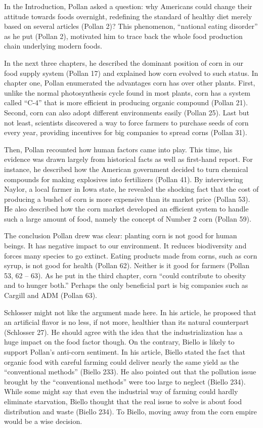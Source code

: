 In the Introduction, Pollan asked a question: why Americans could change
their attitude towards foods overnight, redefining the standard of
healthy diet merely based on several articles (Pollan 2)? This
phenomenon, ``national eating disorder'' as he put (Pollan 2), motivated
him to trace back the whole food production chain underlying modern
foods.

In the next three chapters, he described the dominant position of corn
in our food supply system (Pollan 17) and explained how corn evolved to
such status. In chapter one, Pollan enumerated the advantages corn has
over other plants. First, unlike the normal photosynthesis cycle found
in most plants, corn has a system called ``C-4'' that is more efficient
in producing organic compound (Pollan 21). Second, corn can also adopt
different environments easily (Pollan 25). Last but not least,
scientists discovered a way to force farmers to purchase seeds of corn
every year, providing incentives for big companies to spread corns
(Pollan 31).

Then, Pollan recounted how human factors came into play. This time, his
evidence was drawn largely from historical facts as well as first-hand
report. For instance, he described how the American government decided
to turn chemical compounds for making explosives into fertilizers
(Pollan 41). By interviewing Naylor, a local farmer in Iowa state, he
revealed the shocking fact that the cost of producing a bushel of corn
is more expensive than its market price (Pollan 53). He also described
how the corn market developed an efficient system to handle such a large
amount of food, namely the concept of Number 2 corn (Pollan 59).

The conclusion Pollan drew was clear: planting corn is not good for
human beings. It has negative impact to our environment. It reduces
biodiversity and forces many species to go extinct. Eating products made
from corns, such as corn syrup, is not good for health (Pollan 62).
Neither is it good for farmers (Pollan 53, 62 -- 63). As he put in the
third chapter, corn ``could contribute to obesity and to hunger both.''
Perhaps the only beneficial part is big companies such as Cargill and
ADM (Pollan 63).

Schlosser might not like the argument made here. In his article, he
proposed that an artificial flavor is no less, if not more, healthier
than its natural counterpart (Schlosser 27). He should agree with the
idea that the industrialization has a huge impact on the food factor
though. On the contrary, Biello is likely to support Pollan's anti-corn
sentiment. In his article, Biello stated the fact that organic food with
careful farming could deliver nearly the same yield as the
``conventional methods'' (Biello 233). He also pointed out that the
pollution issue brought by the ``conventional methods'' were too large
to neglect (Biello 234). While some might say that even the industrial
way of farming could hardly eliminate starvation, Biello thought that
the real issue to solve is about food distribution and waste (Biello
234). To Biello, moving away from the corn empire would be a wise
decision.
